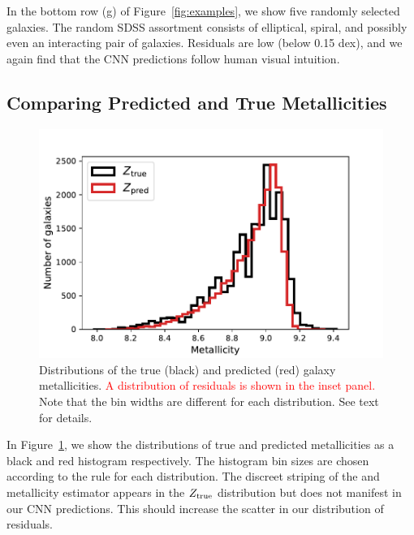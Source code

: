 \documentclass[fleqn,usenatbib]{mnras}
\newcommand{\editorial}[1]{\textcolor{red}{#1}}
\begin{document}
In the bottom row (g) of Figure~\ref{fig:examples}, we show five randomly selected galaxies. The random SDSS assortment consists of elliptical, spiral, and possibly even an interacting pair of galaxies. Residuals are low (below 0.15 dex), and we again find that the CNN predictions follow human visual intuition.

\subsection{Comparing Predicted and True Metallicities}
\begin{figure}
	\includegraphics[width=\columnwidth]{03-Z_distribution.pdf}
	\caption{\label{fig:distributions}
		Distributions of the true (black) and predicted (red) galaxy metallicities. \editorial{A distribution of residuals is shown in the inset panel.} Note that the bin widths are different for each distribution. See text for details.}
\end{figure}

In Figure~\ref{fig:distributions}, we show the distributions of true and predicted metallicities as a black and red histogram respectively. The histogram bin sizes are chosen according to the \cite{Freedman1981} rule for each distribution. The discreet striping of the \cite{Tremonti2004} and \cite{Brinchmann2004} metallicity estimator appears in the $Z_{\rm true}$ distribution but does not manifest in our CNN predictions. This should increase the scatter in our distribution of residuals.

\end{document}
